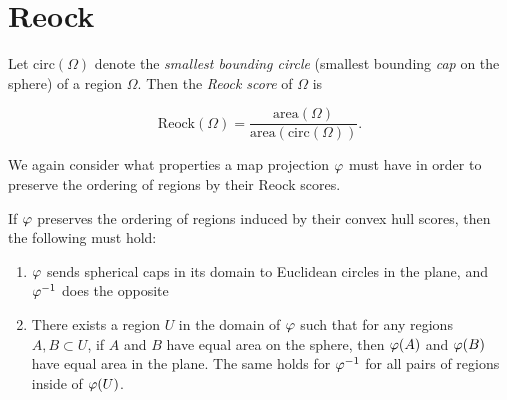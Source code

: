 \section{Reock}\label{sec:reock}

Let $\mathrm{circ}(\Omega)$ denote the \textit{smallest bounding
circle} (smallest bounding \textit{cap} on the sphere) of a region
$\Omega$.  Then the \textit{Reock score} of $\Omega$ is 

$$\mathrm{Reock}(\Omega)=
\frac{\mathrm{area}(\Omega)}{\mathrm{area}(\mathrm{circ}(\Omega))}.$$

We again consider what properties a map projection $\varphi$ must have in order to preserve the ordering of regions by their Reock scores.  

\begin{lemma}\label{lem:reock_prep}
  If $\varphi$ preserves the ordering of regions induced by their convex hull scores, then the following must hold:
  \begin{enumerate}
    \item $\varphi$ sends spherical caps in its domain to Euclidean circles in the plane,  and $\varphi^{-1}$ does the opposite 
    \item There exists a region $U$ in the domain of $\varphi$ such that for any regions $A,B\subset U$, if $A$ and $B$ have equal area on the sphere, then $\varphi(A)$ and $\varphi(B)$ have equal area in the plane.  The same holds for $\varphi^{-1}$ for all pairs of regions inside of $\varphi(U)$.
  \end{enumerate}
\end{lemma}
